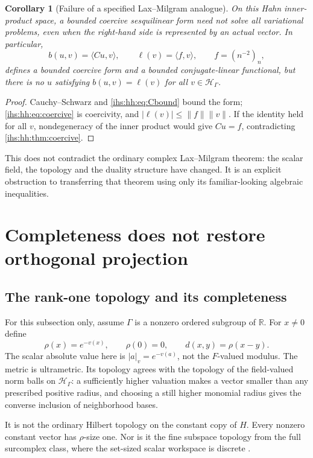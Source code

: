 \documentclass[11pt,a4paper]{article}
\numberwithin{equation}{section}
\newtheorem{corollary}[corollary]{Corollary}
\theoremstyle{definition}
\theoremstyle{remark}
\newcommand{\R}{\mathbb R}
\newcommand{\Fld}{F}
\newcommand{\Hil}{\mathcal H_\Gamma}
\newcommand{\abs}[1]{\lvert#1\rvert}
\newcommand{\norm}[1]{\lVert#1\rVert}
\newcommand{\ip}[2]{\langle#1,#2\rangle}
\begin{document}
\begin{corollary}[Failure of a specified Lax--Milgram analogue]\label{ihs:hh:cor:lax}
On this Hahn inner-product space, a bounded coercive sesquilinear form need
not solve all variational problems, even when the right-hand side is
represented by an actual vector. In particular,
\[
 b(u,v)=\ip{Cu}{v},\qquad \ell(v)=\ip{f}{v},\qquad f=(n^{-2})_n,
\]
defines a bounded coercive form and a bounded conjugate-linear functional,
but there is no $u$ satisfying $b(u,v)=\ell(v)$ for all $v\in\Hil$.
\end{corollary}
\begin{proof}
Cauchy--Schwarz and \eqref{ihs:hh:eq:Cbound} bound the form;
\eqref{ihs:hh:eq:coercive} is coercivity, and
$\abs{\ell(v)}\le\norm{f}\norm{v}$. If the identity held for all $v$,
nondegeneracy of the inner product would give $Cu=f$, contradicting
\cref{ihs:hh:thm:coercive}.
\end{proof}

This does not contradict the ordinary complex Lax--Milgram theorem: the
scalar field, the topology and the duality structure have changed. It is an
explicit obstruction to transferring that theorem using only its
familiar-looking algebraic inequalities.

\section{Completeness does not restore orthogonal projection}\label{ihs:sec:topology}

\subsection{The rank-one topology and its completeness}\label{ihs:hh:sec:rankone}
For this subsection only, assume $\Gamma$ is a nonzero ordered
subgroup of $\R$. For $x\ne0$ define
\[
 \rho(x)=e^{-v(x)},\qquad \rho(0)=0,\qquad d(x,y)=\rho(x-y).
\]
The scalar absolute value here is $|a|_v=e^{-v(a)}$, not the $\Fld$-valued
modulus. The metric is ultrametric. Its topology agrees with the topology of
the field-valued norm balls on $\Hil$: a sufficiently higher valuation makes
a vector smaller than any prescribed positive radius, and choosing a still
higher monomial radius gives the converse inclusion of neighborhood bases.

It is not the ordinary Hilbert topology on the constant copy of $H$. Every
nonzero constant vector has $\rho$-size one. Nor is it the fine subspace
topology from the full surcomplex class, where the set-sized scalar
workspace is discrete \cite{RepoMap}.
\end{document}

